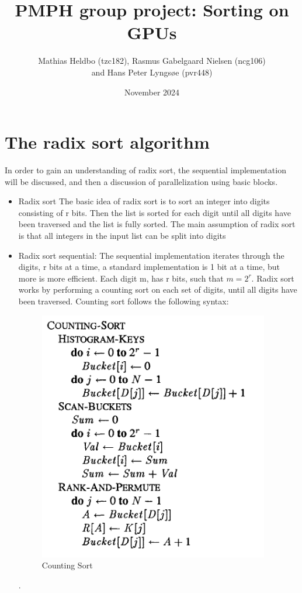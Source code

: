 \documentclass{article}
\title{PMPH group project: Sorting on GPUs}
\author{Mathias Heldbo (tzc182), Rasmus Gabelgaard Nielsen (ncg106) \\ and Hans Peter Lyngsøe (pvr448)}
\date{November 2024}
\begin{document}
\maketitle

\section{The radix sort algorithm }
In order to gain an understanding of radix sort, the sequential implementation will be discussed, and then a discussion of parallelization using basic blocks. 
\begin{itemize}
\item Radix sort
The basic idea of radix sort is to sort an integer into digits consisting of r bits. Then the list is sorted for each digit until all digits have been traversed and the list is fully sorted. The main assumption of radix sort is that all integers in the input list can be split into digits
\item Radix sort sequential:
The sequential implementation iterates through the digits, r bits at a time, a standard implementation is 1 bit at a time, but more is more efficient. Each digit m, has r bits, such that $m = 2^r$. Radix sort works by performing a counting sort on each set of digits, until all digits have been traversed. Counting sort follows the following syntax: 
\begin{figure} [H]
    \includegraphics[width=0.5\linewidth]{count_sort.PNG}
    \caption{Counting Sort \citep{zagharadixvector}}
    \label{fig:enter-label}
\end{figure}.


\end{itemize}
\end{document}
